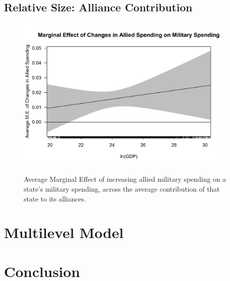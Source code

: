 \documentclass[12pt]{article}
\begin{document}
\subsection{Relative Size: Alliance Contribution} 


\begin{figure}
	\centering
		\includegraphics[width=0.95\textwidth]{abs-margins-plot.pdf}
	\label{fig:abs-margins-plot}
	\caption{Average Marginal Effect of increasing allied military spending on a state's military spending, across the average contribution of that state to its alliances.}
\end{figure}


\section{Multilevel Model}


\section{Conclusion}


\singlespace


%  
 
\end{document}
